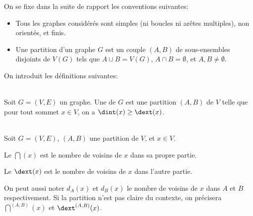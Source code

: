 On se fixe dans la suite de rapport les conventions suivantes:
\begin{itemize}
    \item Tous les graphes considérés sont simples (ni boucles ni arêtes multiples), non orientés, et finis.
    \item Une partition d'un graphe \(G\) est un couple \((A, B)\) de sous-ensembles disjoints de \(V(G)\) tels que \(A \cup B = V(G)\), \(A \cap B = \emptyset\), et \(A, B \neq \emptyset\).
\end{itemize}

On introduit les définitions suivantes:
\begin{definition}\,\\
    Soit \(G = (V, E)\) un graphe.
    Une  de \(G\) est une partition \((A, B)\) de \(V\) telle que pour tout sommet \(x \in V\), on a \(\dint(x) \geq \dext(x)\).
\end{definition}

\begin{definition}\,\\
    Soit \(G = (V, E)\), \((A, B)\) une partition de \(V\), et \(x \in V\).

    Le  \(\dint(x)\) est le nombre de voisins de \(x\) dans sa propre partie.

    Le  \(\dext(x)\) est le nombre de voisins de \(x\) dans l'autre partie.
\end{definition}

\begin{remark}
    On peut aussi noter \(d_A(x)\) et \(d_B(x)\) le nombre de voisins de \(x\) dans \(A\) et \(B\) respectivement.
    Si la partition n'est pas claire du contexte, on précisera \(\dint^{(A,B)}(x)\) et \(\dext^{(A,B)}(x)\).
\end{remark}






%
%

